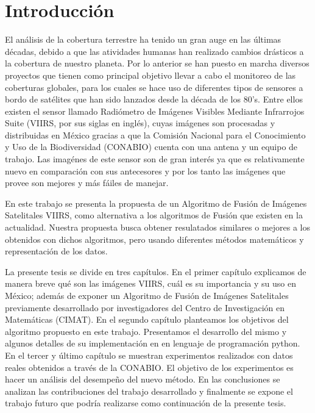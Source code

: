 \chapter{Introducción}

El análisis de la cobertura terrestre ha tenido un gran auge en las últimas décadas, debido a que las atividades humanas han realizado cambios drásticos a la cobertura de nuestro planeta. Por lo anterior se han puesto en marcha diversos proyectos que tienen como principal objetivo llevar a cabo el monitoreo de las coberturas globales, para los cuales se hace uso de diferentes tipos de sensores a bordo de satélites que han sido lanzados desde la década de los 80's. Entre ellos existen el sensor llamado Radiómetro de Imágenes Visibles Mediante Infrarrojos Suite (VIIRS, por sus siglas en inglés), cuyas imágenes son procesadas y distribuidas en México gracias a que la Comisión Nacional para el Conocimiento y Uso de la Biodiversidad (CONABIO) cuenta con una antena y un equipo de trabajo. Las imagénes de este sensor son de gran interés ya que es relativamente nuevo en comparación con sus antecesores y por los tanto las imágenes que provee son mejores y más fáiles de manejar. 

En este trabajo se presenta la propuesta de un Algoritmo de Fusión de Imágenes Satelitales VIIRS, como alternativa a los algoritmos de Fusión que existen en la actualidad. Nuestra propuesta busca obtener resulatados similares o mejores a los obtenidos con dichos algoritmos, pero usando diferentes métodos matemáticos y representación de los datos.

La presente tesis se divide en tres capítulos. En el primer capítulo explicamos de manera breve qué son las imágenes VIIRS, cuál es su importancia y su uso en México; además de exponer un Algoritmo de Fusión de Imágenes Satelitales previamente desarrollado por investigadores del Centro de Investigación en Matemáticas (CIMAT). En el segundo capítulo planteamos los objetivos del algoritmo propuesto en este trabajo. Presentamos el desarrollo del mismo y algunos detalles de su implementación en en lenguaje de programación python. En el tercer y último capítulo se muestran experimentos realizados con datos reales obtenidos a través de la CONABIO. El objetivo de los experimentos es hacer un análisis del desempeño del nuevo método. En las conclusiones se analizan las contribuciones del trabajo desarrollado y finalmente se expone el trabajo futuro que podría realizarse como continuación de la presente tesis.